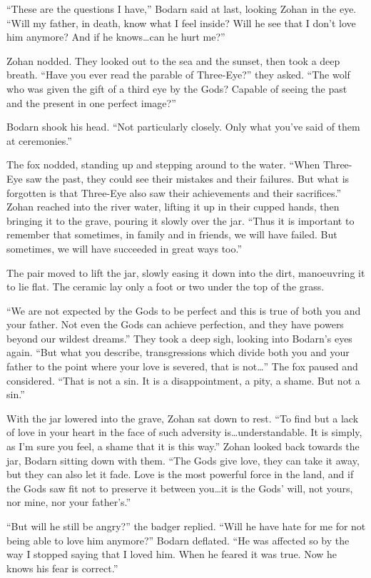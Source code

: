 ``These are the questions I have,'' Bodarn said at last, looking Zohan in the eye. ``Will my father, in death, know what I feel inside? Will he see that I don't love him anymore? And if he knows\ldots{}can he hurt me?''

Zohan nodded. They looked out to the sea and the sunset, then took a deep breath. ``Have you ever read the parable of Three-Eye?'' they asked. ``The wolf who was given the gift of a third eye by the Gods? Capable of seeing the past and the present in one perfect image?''

Bodarn shook his head. ``Not particularly closely. Only what you've said of them at ceremonies.''

The fox nodded, standing up and stepping around to the water. ``When Three-Eye saw the past, they could see their mistakes and their failures. But what is forgotten is that Three-Eye also saw their achievements and their sacrifices.'' Zohan reached into the river water, lifting it up in their cupped hands, then bringing it to the grave, pouring it slowly over the jar. ``Thus it is important to remember that sometimes, in family and in friends, we will have failed. But sometimes, we will have succeeded in great ways too.''

The pair moved to lift the jar, slowly easing it down into the dirt, manoeuvring it to lie flat. The ceramic lay only a foot or two under the top of the grass.

``We are not expected by the Gods to be perfect and this is true of both you and your father. Not even the Gods can achieve perfection, and they have powers beyond our wildest dreams.'' They took a deep sigh, looking into Bodarn's eyes again. ``But what you describe, transgressions which divide both you and your father to the point where your love is severed, that is not\ldots'' The fox paused and considered. ``That is not a sin. It is a disappointment, a pity, a shame. But not a sin.''

With the jar lowered into the grave, Zohan sat down to rest. ``To find but a lack of love in your heart in the face of such adversity is\ldots{}understandable. It is simply, as I'm sure you feel, a shame that it is this way.'' Zohan looked back towards the jar, Bodarn sitting down with them. ``The Gods give love, they can take it away, but they can also let it fade. Love is the most powerful force in the land, and if the Gods saw fit not to preserve it between you\ldots{}it is the Gods' will, not yours, nor mine, nor your father's.''

``But will he still be angry?'' the badger replied. ``Will he have hate for me for not being able to love him anymore?'' Bodarn deflated. ``He was affected so by the way I stopped saying that I loved him. When he feared it was true. Now he knows his fear is correct.''


